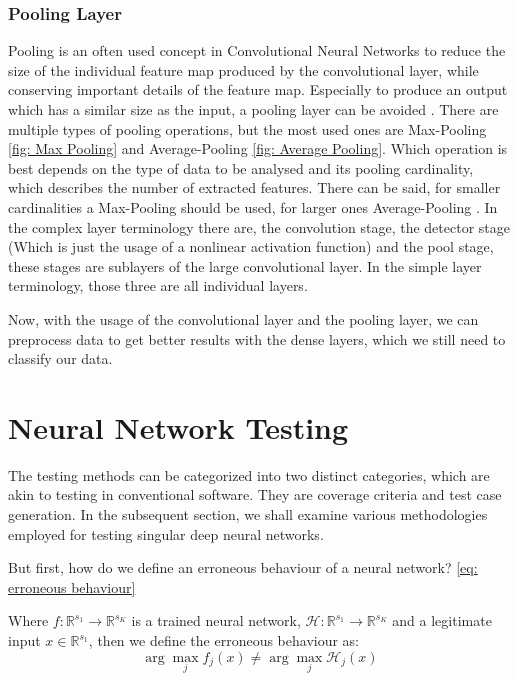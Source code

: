 \subsubsection{Pooling Layer}
Pooling is an often used concept in Convolutional Neural Networks to reduce the size of the individual feature map produced by the convolutional layer, while conserving important details of the feature map.
Especially to produce an output which has a similar size as the input, a pooling layer can be avoided \cite{jain_supervised_2007}.
There are multiple types of pooling operations, but the most used ones are Max-Pooling \ref{fig: Max Pooling} and Average-Pooling \ref{fig: Average Pooling}.
Which operation is best depends on the type of data to be analysed and its pooling cardinality, which describes the number of extracted features.
There can be said, for smaller cardinalities a Max-Pooling should be used, for larger ones Average-Pooling \cite{boureau_theoretical_2010}.
In the complex layer terminology \cite{goodfellow_deep_2016} there are, the convolution stage, the detector stage (Which is just the usage of a nonlinear activation function) and the pool stage, these stages are sublayers of the large convolutional layer.
In the simple layer terminology, those three are all individual layers.


Now, with the usage of the convolutional layer and the pooling layer, we can preprocess data to get better results with the dense layers, which we still need to classify our data.


\section{Neural Network Testing}\label{sec:neural-network-testing}
The testing methods can be categorized into two distinct categories, which are akin to testing in conventional software.
They are coverage criteria and test case generation.
In the subsequent section, we shall examine various methodologies employed for testing singular deep neural networks.\cite{huang_survey_2020}

But first, how do we define an erroneous behaviour of a neural network? \ref{eq: erroneous behaviour}

Where $f: \mathbb{R}^{s_1} \to \mathbb{R}^{s_K}$ is a trained neural network, $\mathcal{H}: \mathbb{R}^{s_1} \to \mathbb{R}^{s_K}$ and a legitimate input $x \in \mathbb{R}^{s_1}$, then we define the erroneous behaviour as:
\begin{equation}
    \arg \max_{j} f_j (x) \neq \arg \max_{j} \mathcal{H}_j (x)
    \label{eq: erroneous behaviour}
\end{equation}

